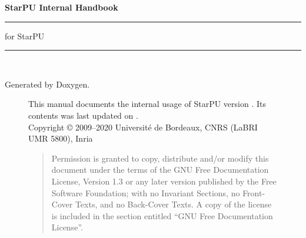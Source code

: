 %
%
%
%
%

\setlength{\parskip}{0pt}
\begin{titlepage}
\vspace*{4cm}
{\Huge \textbf{StarPU Internal Handbook}}\\
\rule{\textwidth}{1.5mm}
\begin{flushright}
{\Large for StarPU \STARPUVERSION}
\end{flushright}
\rule{\textwidth}{1mm}
~\\
\vspace*{15cm}
\begin{flushright}
Generated by Doxygen.
\end{flushright}
\end{titlepage}

\begin{figure}[p]
This manual documents the internal usage of StarPU version \STARPUVERSION. Its contents
was last updated on \STARPUUPDATED.\\

Copyright © 2009–2020 Université de Bordeaux, CNRS (LaBRI UMR 5800), Inria

\medskip

\begin{quote}
Permission is granted to copy, distribute and/or modify this document
under the terms of the GNU Free Documentation License, Version 1.3 or
any later version published by the Free Software Foundation; with no
Invariant Sections, no Front-Cover Texts, and no Back-Cover Texts. A
copy of the license is included in the section entitled “GNU Free
Documentation License”.
\end{quote}
\end{figure}

\setcounter{tocdepth}{1}
\tableofcontents
{}
\hypersetup{pageanchor=true,citecolor=blue}

